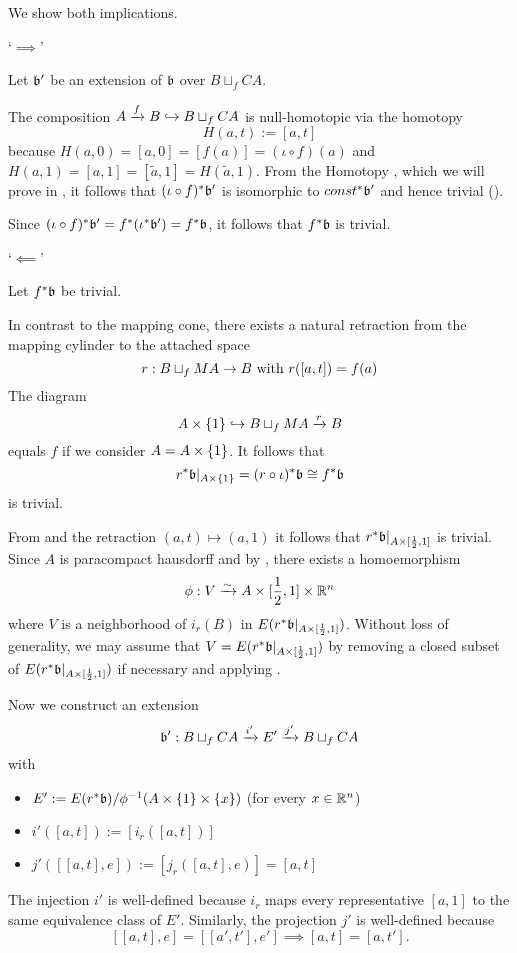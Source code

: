 \begin{myproof}
    We show both implications.

    `$\implies$'

    Let $\bb'$ be an extension of $\bb$ over $B \sqcup_f CA$.

    The composition $A \xto{f} B \incl B \sqcup_f CA$ is
    null-homotopic via the homotopy
    \[ H(a, t) := [a, t] \]
    because $H(a, 0) = [a, 0] = [f(a)] = (\iota \circ f)(a)$
     and $H(a, 1) = [a, 1] = [\tilde{a}, 1] = H(\tilde{a}, 1)$.
    From the Homotopy ,
    which we will prove in ,
    it follows that $\ind{(\iota \circ f)}\bb'$ is
    isomorphic to $\ind{const}\bb'$ and hence trivial ().

    Since $\ind{(\iota \circ f)}\bb' = \ind{f}(\ind{\iota}\bb') = \ind{f}\bb$,
    it follows that $\ind{f}\bb$ is trivial.

    `$\impliedby$'

    Let $\ind{f}\bb$ be trivial.

    In contrast to the mapping cone,
    there exists a natural retraction from the mapping cylinder to the attached space
    \[ r: B \sqcup_f MA \to B \twith r([a, t]) = f(a) \]
    The diagram
    \[ A \times \{1\} \incl B \sqcup_f MA \xto{r} B \]
    equals $f$ if we consider $A = \cylup{A}$.
    It follows that
    \[ \ind{r}\bb\restr{A \times \{1\}} = \ind{(r \circ \iota)}\bb \cong \ind{f}\bb \]
    is trivial.

    From  and the retraction $(a, t) \mapsto (a, 1)$
    it follows that $\ind{r}\bb\restr{A \times [\half, 1]}$ is trivial.
    Since $A$ is paracompact hausdorff and by ,
    there exists a homoemorphism
    \[ \phi: V \isomto A \times [\half, 1] \times \R^n \]
    where $V$ is a neighborhood of $i_r(B)$ in $E(\ind{r}\bb\restr{A \times [\half, 1]})$.
    Without loss of generality,
    we may assume that $V = E(\ind{r}\bb\restr{A \times [\half, 1]})$
    by removing a closed subset of $E(\ind{r}\bb\restr{A \times [\half, 1]})$
    if necessary and applying .

    Now we construct an extension
    \[ \bundledef{\bb'}{B \sqcup_f CA}{E'}{i'}{j'} \]
    with
    \begin{itemize}
        \item $E' := E(\ind{r}\bb) / \inv{\phi}(A \times \{1\} \times \{x\})$ (for every $x \in \R^n$)
        \item $i'([a, t]) := [i_r([a, t])]$
        \item $j'([[a, t], e]) := [j_r([a, t], e)] = [a, t]$
    \end{itemize}
    The injection $i'$ is well-defined because $i_r$ maps every
    representative $[a, 1]$ to the same equivalence class of $E'$.
    Similarly, the projection $j'$ is well-defined because
    \[ [[a, t], e] = [[a', t'], e'] \implies  [a, t] = [a, t']. \]


\end{myproof}
